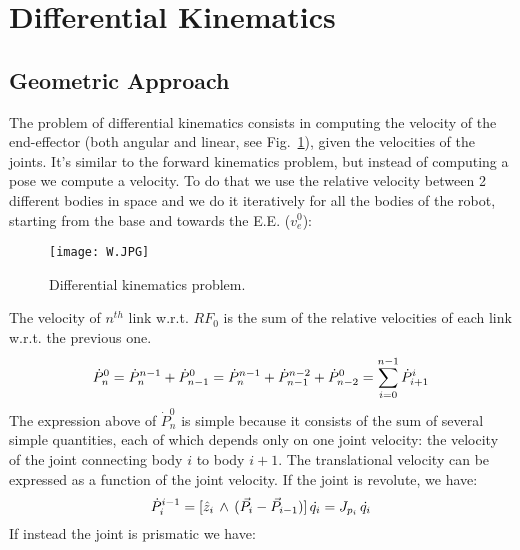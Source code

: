 \section{Differential Kinematics}
\subsection{Geometric Approach}
                    The problem of differential kinematics consists in computing the velocity of the end-effector (both angular and linear, see Fig.~\ref{fig:diff_kin_problem}), given the velocities of the joints.
                    It's similar to the forward kinematics problem, but instead of computing a pose we compute a velocity.
                    To do that we use the relative velocity between 2 different bodies in space and we do it iteratively for all the bodies of the robot, starting from the base and towards the E.E. (${v^{0}_e}$):
%                                        
                    \begin{figure}[t]    
                    	\centering
                        \texttt{[image: W.JPG]}
                        \caption{Differential kinematics problem.}
                        \label{fig:diff_kin_problem}
                    \end{figure}
%                    
                    The velocity of $n^{th}$ link w.r.t. $RF_0$ is the sum of the relative velocities of each link w.r.t. the previous one.
                    \begin{equation}{\label{1stEq}}
                        \dot{P}^{0}_{n} = \dot{P}^{n-1}_{n} + \dot{P}^{0}_{n-1} = \dot{P}^{n-1}_{n} + \dot{P}^{n-2}_{n-1} + \dot{P}^{0}_{n-2} = \sum_{i = 0}^{n-1} \dot{P}^{i}_{i+1} 
                    \end{equation}
%                    
                    The expression above of $\dot{P}^{0}_{n}$ is simple because it consists of the sum of several simple quantities, each of which depends only on one joint velocity: the velocity of the joint connecting body $i$ to body $i+1$. 
                    The translational velocity can be expressed as a function of the joint velocity.
                    If the joint is revolute, we have:
                    \begin{equation}{\label{2Eq}}
                        \dot{P}^{i-1}_{i} = [\hat{z}_i \, \wedge \, (\vec{P_i} - {\vec{P}}_{i-1} )] \, \dot{q_i} = J_{p_{i}} \, \dot{q_i}
                    \end{equation} 
	           If instead the joint is prismatic we have:
